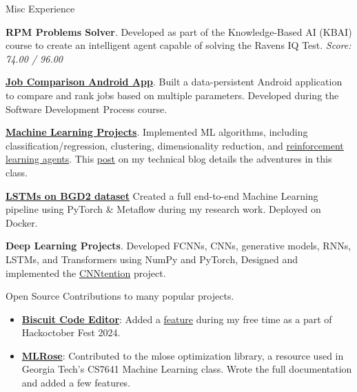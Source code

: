 \begin{rubric}{Misc Experience}


\entry*[Summer 2023] \textbf{RPM Problems Solver}. Developed as part of the Knowledge-Based AI (KBAI) course to create an intelligent agent capable of solving the Ravens IQ Test.  
\textit{Score: 74.00 / 96.00}  

\entry*[Fall 2023] \textbf{\href{https://www.youtube.com/watch?v=BDsmPKvq3rs}{Job Comparison Android App}}. Built a data-persistent Android application to compare and rank jobs based on multiple parameters. Developed during the Software Development Process course.  

\entry*[Spring 2024] \textbf{\href{https://github.com/nkapila6/mlrose-ky}{Machine Learning Projects}}. Implemented ML algorithms, including classification/regression, clustering, dimensionality reduction, and \href{https://www.youtube.com/watch?v=6nc1xtTQcNY}{reinforcement learning agents}. This \href{https://nkapila.me/masters/cs7641-review}{post} on my technical blog details the adventures in this class.

\entry*[Summer 2024] \textbf{\href{https://github.com/nkapila6/lstm-bgd2}{LSTMs on BGD2 dataset}} Created a full end-to-end Machine Learning pipeline using PyTorch \& Metaflow during my research work. Deployed on Docker.

\entry*[Fall 2024] \textbf{Deep Learning Projects}. Developed FCNNs, CNNs, generative models, RNNs, LSTMs, and Transformers using NumPy and PyTorch, Designed and implemented the \href{https://github.com/AttentionSeekers/CNNtention}{CNNtention} project.

 Open Source Contributions to many popular projects.
\begin{itemize}
    \item \textbf{\href{https://github.com/tomlin7/biscuit/}{Biscuit Code Editor}}: Added a \href{https://github.com/tomlin7/biscuit/pull/420}{feature} during my free time as a part of Hackoctober Fest 2024.
    \item \textbf{\href{https://nkapila6.github.io/mlrose-ky/}{MLRose}}: Contributed to the mlose optimization library, a resource used in Georgia Tech's CS7641 Machine Learning class. Wrote the full documentation and added a few features. 
\end{itemize}


\end{rubric}
